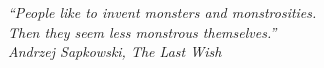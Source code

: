 \begin{epigrafe}
    \vspace*{\fill}
	\begin{flushright}
		\textit{``People like to invent monsters and monstrosities.\\ Then they seem less monstrous themselves.''\\Andrzej Sapkowski, The Last Wish }
	\end{flushright}
\end{epigrafe}









